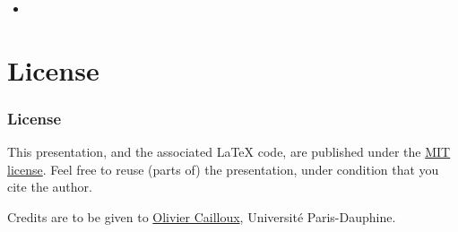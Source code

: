 \documentclass[french, english]{beamer}
\begin{document}
\begin{frame}
	\frametitle{}
	\begin{itemize}
		\item 
	\end{itemize}
\end{frame}


\appendix

\section{License}
\begin{frame}
	\frametitle{License}
	This presentation, and the associated \LaTeX{} code, are published under the \href{http://opensource.org/licenses/MIT}{MIT license}. Feel free to reuse (parts of) the presentation, under condition that you cite the author.
	
	Credits are to be given to \href{http://www.lamsade.dauphine.fr/~ocailloux/}{Olivier Cailloux}, Université Paris-Dauphine.
\end{frame}
\end{document}
